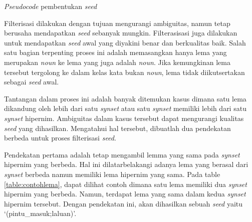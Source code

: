 \begin{kode}\label{(seed_builder)}
  
  \label{code:seedbuilder}  
  \caption{\textit{Pseudocode} pembentukan \textit{seed}}  
\end{kode}

Filterisasi dilakukan dengan tujuan mengurangi ambiguitas, namun tetap berusaha mendapatkan \textit{seed} sebanyak mungkin. Filterasisasi juga dilakukan untuk mendapatkan \textit{seed} awal yang diyakini benar dan berkualitas baik. Salah satu bagian terpenting proses ini adalah memasangkan hanya lema yang merupakan \textit{noun} ke lema yang juga adalah \textit{noun}. Jika kemungkinan lema tersebut tergolong ke dalam kelas kata bukan \textit{noun}, lema tidak diikutsertakan sebagai \textit{seed} awal.

Tantangan dalam proses ini adalah banyak ditemukan kasus dimana satu lema dikandung oleh lebih dari satu \textit{synset} atau satu \textit{synset} memiliki lebih dari satu \textit{synset} hipernim. Ambiguitas dalam kasus tersebut dapat mengurangi kualitas \textit{seed} yang dihasilkan. Mengatahui hal tersebut, dibuatlah dua pendekatan berbeda untuk proses filterisasi \textit{seed}.

Pendekatan pertama adalah tetap mengambil lemma yang sama pada \textit{synset} hipernim yang berbeda. Hal ini dilatarbelakangi adanya lema yang berasal dari \textit{synset} berbeda namun memiliki lema hipernim yang sama. Pada table \ref{table:contohlema}, dapat dilihat contoh dimana satu lema memiliki dua \textit{synset} hipernim yang berbeda. Namun, terdapat lema yang sama dalam kedua \textit{synset} hipernim tersebut. Dengan pendekatan ini, akan dihasilkan sebuah \textit{seed} yaitu `(pintu\_masuk;laluan)'.

